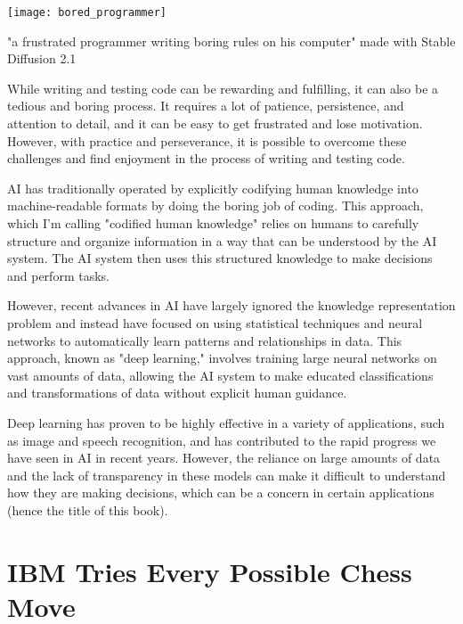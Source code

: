 \begin{marginfigure}[-5.5cm]
        \texttt{[image: bored\_programmer]}
        \caption{"a frustrated programmer writing boring rules on his computer" made with Stable Diffusion 2.1}
\end{marginfigure}

While writing and testing code can be rewarding and fulfilling, it can also be a tedious and boring process. It requires a lot of patience, persistence, and attention to detail, and it can be easy to get frustrated and lose motivation. However, with practice and perseverance, it is possible to overcome these challenges and find enjoyment in the process of writing and testing code.

AI has traditionally operated by explicitly codifying human knowledge into machine-readable formats by doing the boring job of coding. This approach, which I'm calling "codified human knowledge" relies on humans to carefully structure and organize information in a way that can be understood by the AI system. The AI system then uses this structured knowledge to make decisions and perform tasks.

However, recent advances in AI have largely ignored the knowledge representation problem and instead have focused on using statistical techniques and neural networks to automatically learn patterns and relationships in data. This approach, known as "deep learning," involves training large neural networks on vast amounts of data, allowing the AI system to make educated classifications and transformations of data without explicit human guidance.

Deep learning has proven to be highly effective in a variety of applications, such as image and speech recognition, and has contributed to the rapid progress we have seen in AI in recent years. However, the reliance on large amounts of data and the lack of transparency in these models can make it difficult to understand how they are making decisions, which can be a concern in certain applications (hence the title of this book).

\section{IBM Tries Every Possible Chess Move}


